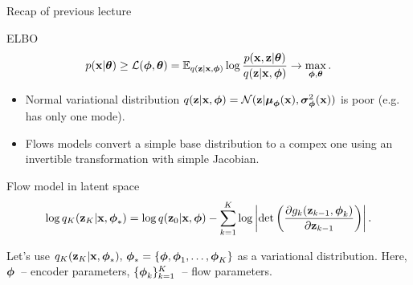 \begin{frame}{Recap of previous lecture}
	\begin{block}{ELBO}
		\vspace{-0.3cm}
		\[
			p(\mathbf{x} | \boldsymbol{\theta}) \geq \mathcal{L} (\boldsymbol{\phi}, \boldsymbol{\theta})  = \mathbb{E}_{q(\mathbf{z} | \mathbf{x}, \boldsymbol{\phi})} \log \frac{p(\mathbf{x}, \mathbf{z} | \boldsymbol{\theta})}{q(\mathbf{z}| \mathbf{x}, \boldsymbol{\phi})} \rightarrow \max_{\boldsymbol{\phi}, \boldsymbol{\theta}}.
		\]
		\vspace{-0.5cm}
	\end{block}
		\begin{itemize}
			\item Normal variational distribution $q(\mathbf{z} | \mathbf{x}, \boldsymbol{\phi}) = \mathcal{N}(\mathbf{z}| \boldsymbol{\mu}_{\boldsymbol{\phi}}(\mathbf{x}), \boldsymbol{\sigma}^2_{\boldsymbol{\phi}}(\mathbf{x}))$ is poor (e.g. has only one mode). \\
			\item Flows models convert a simple base distribution to a compex one using an invertible transformation with simple Jacobian. 
		\end{itemize}
	\begin{block}{Flow model in latent space}
		\vspace{-0.7cm}
		\[
			\log q_K(\mathbf{z}_K | \mathbf{x}, \boldsymbol{\phi}_*) = \log q(\mathbf{z}_0 | \mathbf{x}, \boldsymbol{\phi}) - \sum_{k=1}^K \log \left| \det \left( \frac{\partial g_k(\mathbf{z}_{k - 1}, \boldsymbol{\phi}_k)}{\partial \mathbf{z}_{k-1}} \right) \right|.
		\]
		\vspace{-0.5cm}
	\end{block}
	Let's use $q_K(\mathbf{z}_K | \mathbf{x}, \boldsymbol{\phi}_*), \, \boldsymbol{\phi}_* = \{\boldsymbol{\phi}, \boldsymbol{\phi}_1, \dots, \boldsymbol{\phi}_K\}$ as a variational distribution. Here, $\boldsymbol{\phi}$~-- encoder parameters, $\{\boldsymbol{\phi}_k\}_{k=1}^K$~-- flow parameters.
	
\end{frame}
